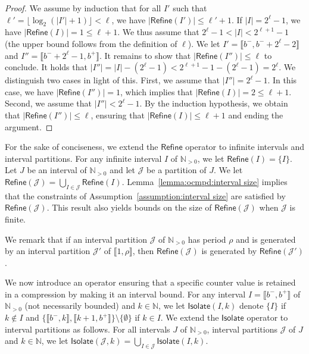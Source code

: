 \documentclass[a4paper,UKenglish,cleveref,autoref,thm-restate,colorlinks]{lipics-v2021}
\newcommand{\integerInterval}[1]{\llbracket{}#1\rrbracket{}}
\newcommand{\IN}{\mathbb{N}}
\newcommand{\INpos}{\IN_{>0}}
\newcommand{\ocCount}{k}
\newcommand{\period}{\rho}
\newcommand{\intPartB}{\mathcal{J}}
\newcommand{\interval}{I}
\newcommand{\intervalB}{J}
\newcommand{\intBound}{b}
\newcommand{\intLB}{\intBound^-}
\newcommand{\intUB}{\intBound^+}
\begin{document}
\begin{proof}
  We assume by induction that for all $\interval'$ such that $\ell'=\lfloor\log_2(|\interval'|+1)\rfloor < \ell$, we have $|\mathsf{Refine}(\interval')|\leq\ell'+1$.
  If $|\interval| = 2^\ell-1$, we have $|\mathsf{Refine}(\interval)|=1\leq\ell+1$.
  We thus assume that $2^\ell-1 <|\interval| < 2^{\ell+1}-1$ (the upper bound follows from the definition of $\ell$).
  We let $\interval' = \integerInterval{\intLB, \intLB + 2^\ell -2}$ and $\interval'' = \integerInterval{\intLB + 2^\ell -1, \intUB}$.
  It remains to show that $|\mathsf{Refine}(\interval'')|\leq\ell$ to conclude.
  It holds that $|\interval''| = |\interval| - (2^{\ell}-1) < 2^{\ell+1}-1 - (2^{\ell}-1) = 2^\ell$.
  We distinguish two cases in light of this.
  First, we assume that $|\interval''| = 2^\ell-1$.
  In this case, we have $|\mathsf{Refine}(\interval'')|=1$, which implies that $|\mathsf{Refine}(\interval)|=2\leq \ell+1$.
  Second, we assume that $|\interval''| < 2^\ell-1$.
  By the induction hypothesis, we obtain that $|\mathsf{Refine}(\interval'')|\leq\ell$, ensuring that $|\mathsf{Refine}(\interval)|\leq\ell+1$ and ending the argument.
\end{proof}

For the sake of conciseness, we extend the $\mathsf{Refine}$ operator to infinite intervals and interval partitions.
For any infinite interval $\interval$ of $\INpos$, we let $\mathsf{Refine}(\interval) = \{\interval\}$.
Let $\intervalB$ be an interval of $\INpos$ and let $\intPartB$ be a partition of $\intervalB$.
We let $\mathsf{Refine}(\intPartB) = \bigcup_{\interval\in\intPartB}\mathsf{Refine}(\interval)$.
Lemma~\ref{lemma:ocmpd:interval size} implies that the constraints of Assumption~\ref{assumption:interval size} are satisfied by $\mathsf{Refine}(\intPartB)$. 
This result also yields bounds on the size of $\mathsf{Refine}(\intPartB)$ when $\intPartB$ is finite.

We remark that if an interval partition $\intPartB$ of $\INpos$ has period $\period$ and is generated by an interval partition $\intPartB'$ of $\integerInterval{1, \period}$, then $\mathsf{Refine}(\intPartB)$ is generated by $\mathsf{Refine}(\intPartB')$.

We now introduce an operator ensuring that a specific counter value is retained in a compression by making it an interval bound.
For any interval $\interval=\integerInterval{\intLB, \intUB}$ of $\INpos$ (not necessarily bounded) and $\ocCount\in\IN$, we let $\mathsf{Isolate}(\interval, \ocCount)$ denote $\{\interval\}$ if $\ocCount\notin\interval$ and $\{\integerInterval{\intLB, \ocCount}, \integerInterval{\ocCount+1, \intUB}\}\setminus\{\emptyset\}$ if $\ocCount\in\interval$.
We extend the $\mathsf{Isolate}$ operator to interval partitions as follows.
For all intervals $\intervalB$ of $\INpos$, interval partitions $\intPartB$ of $\intervalB$ and $\ocCount\in\IN$, we let $\mathsf{Isolate}(\intPartB, \ocCount) = \bigcup_{\interval\in\intPartB}\mathsf{Isolate}(\interval, \ocCount)$.
\end{document}
